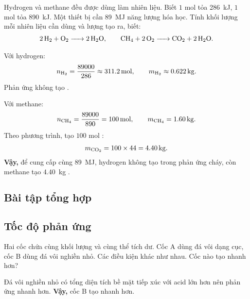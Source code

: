 \begin{tuluyen}
Hydrogen và methane đều được dùng làm nhiên liệu. Biết $1$ mol  tỏa \SI{286}{\kilo\joule}, $1$ mol  tỏa \SI{890}{\kilo\joule}. Một thiết bị cần \SI{89}{\mega\joule} năng lượng hóa học. Tính khối lượng mỗi nhiên liệu cần dùng và lượng  tạo ra, biết:
\[
\ce{2H2 + O2 -> 2H2O},\qquad
\ce{CH4 + 2O2 -> CO2 + 2H2O}.
\]
\begin{loigiaiBT}
Với hydrogen:
\[
n_{\ce{H2}}=\frac{89000}{286}\approx\SI{311.2}{\mole},\qquad
m_{\ce{H2}}\approx\SI{0.622}{\kilo\gram}.
\]
Phản ứng không tạo .

Với methane:
\[
n_{\ce{CH4}}=\frac{89000}{890}=\SI{100}{\mole},\qquad
m_{\ce{CH4}}=\SI{1.60}{\kilo\gram}.
\]
Theo phương trình, tạo $100$ mol :
\[
m_{\ce{CO2}}=100\times44=\SI{4.40}{\kilo\gram}.
\]
\textbf{Vậy,} để cung cấp cùng \SI{89}{\mega\joule}, hydrogen không tạo  trong phản ứng cháy, còn methane tạo \SI{4.40}{\kilo\gram} .
\end{loigiaiBT}
\end{tuluyen}

\subsection{Bài tập tổng hợp}







\subsection{Tốc độ phản ứng}

\begin{tuluyen}
Hai cốc chứa cùng khối lượng  và cùng thể tích  dư. Cốc A dùng đá vôi dạng cục, cốc B dùng đá vôi nghiền nhỏ. Các điều kiện khác như nhau. Cốc nào tạo  nhanh hơn?
\begin{loigiaiBT}
Đá vôi nghiền nhỏ có tổng diện tích bề mặt tiếp xúc với acid lớn hơn nên phản ứng nhanh hơn.
\textbf{Vậy,} cốc B tạo  nhanh hơn.
\end{loigiaiBT}
\end{tuluyen}

